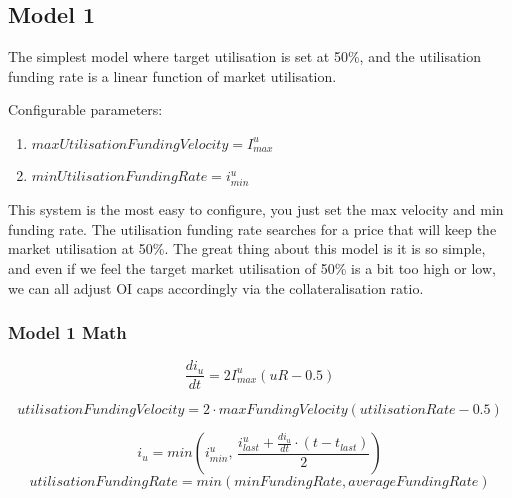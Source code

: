 \documentclass[]{article}
\begin{document}

\subsection{Model 1}

The simplest model where target utilisation is set at 50\%, and the utilisation funding rate is a linear function of market utilisation.

Configurable parameters:
\begin{enumerate}
\item $maxUtilisationFundingVelocity = I^u_{max}$
\item $minUtilisationFundingRate = i^u_{min}$
\end{enumerate}


This system is the most easy to configure, you just set the max velocity and min funding rate. The utilisation funding rate searches for a price that will keep the market utilisation at 50\%. The great thing about this model is it is so simple, and even if we feel the target market utilisation of 50\% is a bit too high or low, we can all adjust OI caps accordingly via the collateralisation ratio.

\subsubsection{Model 1 Math}

$$
\frac{di_u}{dt} = 2 I^u_{max}(uR - 0.5)
$$

$$
utilisationFundingVelocity = 2 \cdot maxFundingVelocity(utilisationRate - 0.5)
$$

$$
i_u = min\left(i^u_{min},\, \frac{i^u_{last} + \frac{di_u}{dt} \cdot (t - t_{last})}{2}\right)
$$
$$
utilisationFundingRate = min(minFundingRate, averageFundingRate)
$$
\end{document}
